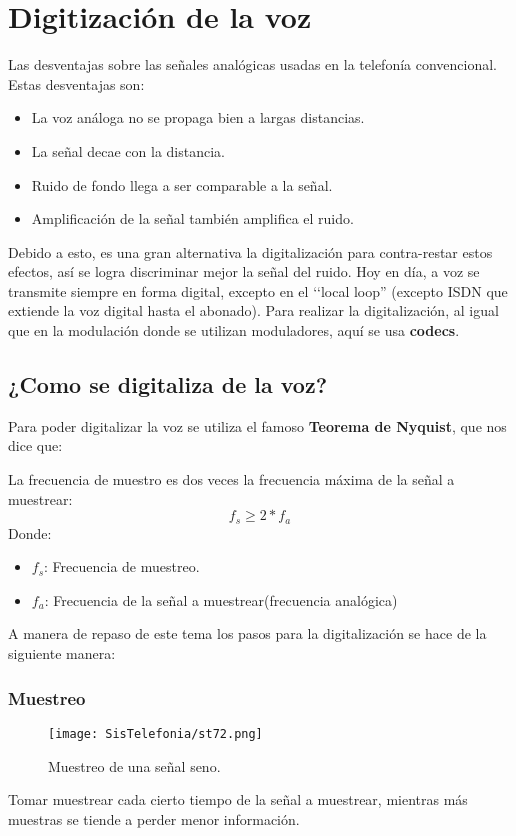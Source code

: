 \documentclass[
	12pt, %
	fleqn, %
	a4paper, %
	oneside, %
]{LegrandOrangeBook}
\begin{document}
\section{Digitización de la voz}
Las desventajas sobre las señales analógicas usadas en la telefonía convencional. Estas desventajas son:
\begin{itemize}
\item La voz análoga no se propaga bien a largas distancias.
\item La señal decae con la distancia.
\item Ruido de fondo llega a ser comparable a la señal.
\item Amplificación de la señal también amplifica el ruido.
\end{itemize}
Debido a esto, es una gran alternativa la digitalización para contra-restar estos efectos, así se logra discriminar mejor la señal del ruido. Hoy en día, a voz se transmite siempre en forma digital, excepto en el ‘‘local loop'' (excepto ISDN que extiende la voz digital hasta el abonado). Para realizar la digitalización, al igual que en la modulación donde se utilizan moduladores, aquí se usa \textbf{codecs}.
\subsection{¿Como se digitaliza de la voz?}
Para poder digitalizar la voz se utiliza el famoso \textbf{Teorema de Nyquist}, que nos dice que:
\begin{definition}
La frecuencia de muestro es dos veces la frecuencia máxima de la señal a muestrear:
\begin{equation}\label{eq:Nyquist}
f_s\geq2*f_a 
\end{equation}
Donde:
\begin{itemize}
\item $f_s$: Frecuencia de muestreo.
\item $f_a$: Frecuencia de la señal a muestrear(frecuencia analógica)
\end{itemize}
\end{definition}
A manera de repaso de este tema los pasos para la digitalización se hace de la siguiente manera:
\subsubsection{Muestreo}
\begin{figure}[H]
\centering
\texttt{[image: SisTelefonia/st72.png]}
\caption{Muestreo de una señal seno.}
\label{fig:muestreoseno}
\end{figure}
Tomar muestrear cada cierto tiempo de la señal a muestrear, mientras más muestras se tiende a perder menor información.
\end{document}
